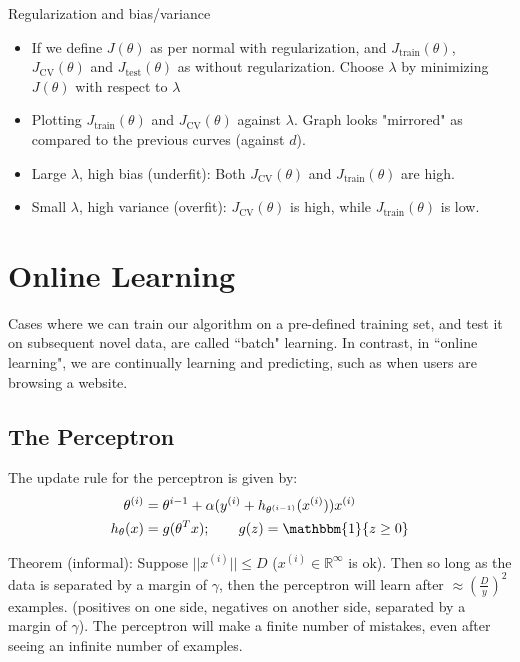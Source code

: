 \documentclass[letterpaper,10pt]{article}
\begin{document}
Regularization and bias/variance
	\begin{itemize}
	\item If we define $J(\theta)$ as per normal with regularization, and $J_\text{train} (\theta)$, $J_\text{CV} (\theta)$ and $J_\text{test} (\theta)$ as without regularization. Choose $\lambda$ by minimizing $J(\theta)$ with respect to $\lambda$
	\item Plotting $J_\text{train} (\theta)$ and $J_\text{CV} (\theta)$ against $\lambda$. Graph looks "mirrored" as compared to the previous curves (against $d$).
	\item Large $\lambda$, high bias (underfit): Both $J_\text{CV} (\theta)$ and $J_\text{train} (\theta)$ are high.
	\item Small $\lambda$, high variance (overfit): $J_\text{CV} (\theta)$ is high, while $J_\text{train} (\theta)$ is low.
	\end{itemize}
	


\section{Online Learning}

Cases where we can train our algorithm on a pre-defined training set, and test it on subsequent novel data, are called ``batch" learning. In contrast, in ``online learning", we are continually learning and predicting, such as when users are browsing a website.

\subsection{The Perceptron}

The update rule for the perceptron is given by:
\begin{align}
\theta^{(i)} &= \theta^{i-1} + \alpha(y^{(i)} + h_{\theta^{(i-1)}}(x^{(i)})) x^{(i)} \\
h_\theta (x) &= g(\theta^T x) ; \qquad g(z) = \mathbbm{1} \{z \geq 0 \}
\end{align}

Theorem (informal): Suppose $||x^{(i)}|| \leq D$ ($x^{(i)} \in \mathbb{R}^\infty$ is ok). Then so long as the data is separated by a margin of $\gamma$, then the perceptron will learn after $\approx(\frac{D}{y})^2$ examples.
(positives on one side, negatives on another side, separated by a margin of $\gamma$). The perceptron will make a finite number of mistakes, even after seeing an infinite number of examples.
\end{document}

